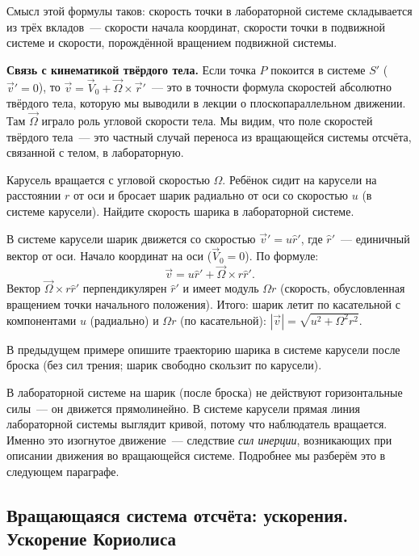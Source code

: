 \documentclass[../main.tex]{subfiles}
\begin{document}
Смысл этой формулы таков: скорость точки в лабораторной системе
складывается из трёх вкладов~--- скорости начала координат,
скорости точки в подвижной системе и скорости, порождённой
вращением подвижной системы.

\noindent\textbf{Связь с кинематикой твёрдого тела.}
Если точка $P$ покоится в системе $S'$ ($\vec{v}' = 0$),
то $\vec{v} = \vec{V}_0 + \vec{\Omega}\times\vec{r}'$~---
это в точности формула скоростей абсолютно твёрдого тела,
которую мы выводили в лекции о плоскопараллельном движении.
Там $\vec{\Omega}$ играло роль угловой скорости тела.
Мы видим, что поле скоростей твёрдого тела~---
это частный случай переноса из вращающейся системы отсчёта,
связанной с телом, в лабораторную.

\begin{example}
Карусель вращается с угловой скоростью $\Omega$.
Ребёнок сидит на карусели на расстоянии $r$ от оси и бросает
шарик радиально от оси со скоростью $u$ (в системе карусели).
Найдите скорость шарика в лабораторной системе.

В системе карусели шарик движется со скоростью $\vec{v}' = u\hat{r}'$,
где $\hat{r}'$~--- единичный вектор от оси. Начало координат
на оси ($\vec{V}_0 = 0$). По формуле:
\[
    \vec{v} = u\hat{r}' + \vec{\Omega}\times r\hat{r}'.
\]
Вектор $\vec{\Omega}\times r\hat{r}'$ перпендикулярен $\hat{r}'$
и имеет модуль $\Omega r$ (скорость, обусловленная вращением
точки начального положения).
Итого: шарик летит по касательной с компонентами $u$ (радиально)
и $\Omega r$ (по касательной):
$|\vec{v}| = \sqrt{u^2 + \Omega^2 r^2}$.
\end{example}

\begin{example}
В предыдущем примере опишите траекторию шарика в системе карусели
после броска (без сил трения; шарик свободно скользит по карусели).

В лабораторной системе на шарик (после броска) не действуют
горизонтальные силы~--- он движется прямолинейно. В системе
карусели прямая линия лабораторной системы выглядит кривой,
потому что наблюдатель вращается.
Именно это изогнутое движение~--- следствие \textit{сил инерции},
возникающих при описании движения во вращающейся системе.
Подробнее мы разберём это в следующем параграфе.
\end{example}

\subsection{Вращающаяся система отсчёта: ускорения. Ускорение Кориолиса}
\end{document}
